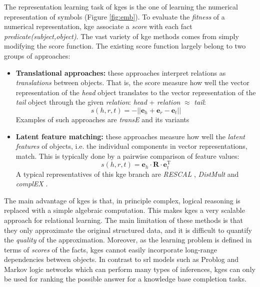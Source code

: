 The representation learning task of \gls{kge}s is the one of learning the numerical representation of symbols (Figure \ref{fig:emb}).
To evaluate the \textit{fitness} of a numerical representation, \gls{kge} associate a \textit{score} with each fact \textit{predicate(subject,object)}.
The vast variety of \gls{kge} methods comes from simply modifying the score function.
The existing score function largely belong to two groups of approaches:
\begin{itemize}
	\item \textbf{Translational approaches:} these approaches interpret relations as \textit{translations} between objects. That is, the score measure how well the vector representation of the \textit{head} object translates to the vector representation of the \textit{tail} object through the given \textit{relation}: \textit{head} + \textit{relation} $\approx$ \textit{tail}:
		\begin{equation}
			s(h,r,t) = - || \mathbf{e}_{h} + \mathbf{e}_{r} - \mathbf{e}_{t} ||
		\end{equation}
		Examples of such approaches are \textit{transE} \cite{Bordes:2013:TEM} and its variants \cite{Lin:2015:LER:2886521.2886624,nguyen-EtAl:2016:N16-1,Arbelaitz:2013,P15-1067}
	\item \textbf{Latent feature matching:} these approaches measure how well the \textit{latent features} of objects, i.e. the individual components in vector representations, match. This is typically done by a pairwise comparison of feature values:
	 	\begin{equation}
	 		s(h,r,t) = \mathbf{e}_{h} \cdot \mathbf{R} \cdot \mathbf{e}_{t}^{\text{T}}
	 	\end{equation}
	 	A typical representatives of this \gls{kge} branch are \textit{RESCAL} \cite{Nickel2011}, \textit{DistMult} \cite{YangYHGD14a} and \textit{complEX} \cite{trouillon2016complex}.
\end{itemize}


The main advantage of \gls{kge}s is that, in principle complex, logical reasoning is replaced with a simple algebraic computation.
This makes \gls{kge}s a very scalable approach for relational learning.
The main limitation of these methods is that they only approximate the original structured data, and it is difficult to quantify the \textit{quality} of the approximation.
Moreover, as the learning problem is defined in terms of \textit{scores} of the facts, \gls{kge}s cannot easily incorporate  long-range dependencies between objects.
In contrast to \gls{srl} models such as Problog and Markov logic networks which can perform many types of inferences, \gls{kge}s can only be used for ranking the possible answer for a knowledge base completion tasks. 
   

